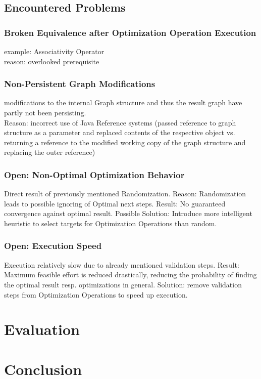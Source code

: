 \documentclass[
	accentcolor=1c,%
	type=intern,
	marginpar=false,
	ruledheaders=section,
	class=report,
	BCOR=5mm,
      parskip=half-,
	fontsize=10pt
	]{tudapub}
\begin{document}
	\subsection{Encountered Problems}

		\subsubsection{Broken Equivalence after Optimization Operation Execution}
			example: Associativity Operator\\
			reason: overlooked prerequisite

		\subsubsection{Non-Persistent Graph Modifications}
			modifications to the internal Graph structure and thus the result graph have partly not been persisting.\\
			Reason: incorrect use of Java Reference systems (passed reference to graph structure as a parameter and replaced contents of the respective object vs. returning a reference to the modified working copy of the graph structure and replacing the outer reference)

		\subsubsection{Open: Non-Optimal Optimization Behavior}
			Direct result of previously mentioned Randomization.
			Reason: Randomization leads to possible ignoring of Optimal next steps.
			Result: No guaranteed convergence against optimal result.
			Possible Solution: Introduce more intelligent heuristic to select targets for Optimization Operations than random.

		\subsubsection{Open: Execution Speed}
			Execution relatively slow due to already mentioned validation steps.
			Result: Maximum feasible effort is reduced drastically, reducing the probability of finding the optimal result resp. optimizations in general.
			Solution: remove validation steps from Optimization Operations to speed up execution.




	\newpage
	\section{Evaluation}

	\newpage
	\section{Conclusion}
\end{document}
